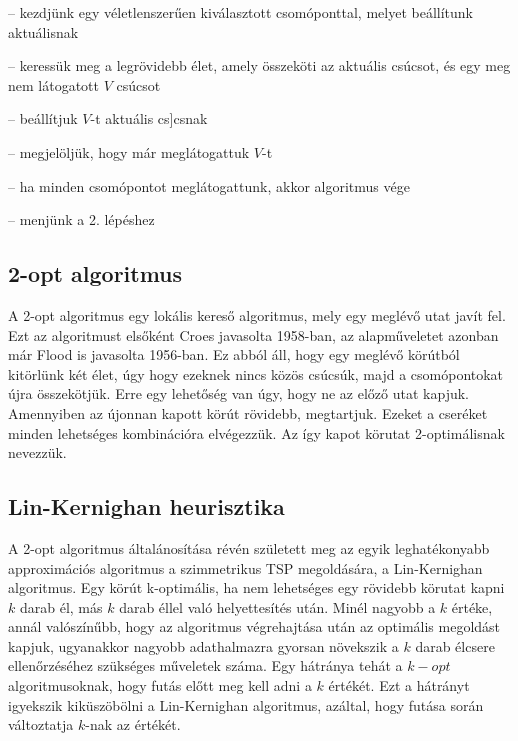 \begin{description}
	\setlength{\itemsep}{0.04mm}
	\item[1. lépés] -- kezdjünk egy véletlenszerűen kiválasztott csomóponttal, melyet beállítunk aktuálisnak
	\item[2. lépés] -- keressük meg a legrövidebb élet, amely összeköti az aktuális csúcsot, és egy meg nem látogatott \(V\) csúcsot
	\item[3. lépés] -- beállítjuk \(V\)-t aktuális cs]csnak
	\item[4. lépés] -- megjelöljük, hogy már meglátogattuk \(V\)-t
	\item[5. lépés] -- ha minden csomópontot meglátogattunk, akkor algoritmus vége
	\item[6. lépés] -- menjünk a 2. lépéshez
\end{description}

\subsection{2-opt algoritmus}

A 2-opt algoritmus egy lokális kereső algoritmus, mely egy meglévő utat javít fel. Ezt az algoritmust elsőként Croes javasolta 1958-ban, az alapműveletet azonban már Flood is javasolta 1956-ban. Ez abból áll, hogy egy meglévő körútból kitörlünk két élet, úgy hogy ezeknek nincs közös csúcsúk, majd a csomópontokat újra összekötjük. Erre egy lehetőség van úgy, hogy ne az előző utat kapjuk. Amennyiben az újonnan kapott körút rövidebb, megtartjuk. Ezeket a cseréket minden lehetséges kombinációra elvégezzük. Az így kapot körutat 2-optimálisnak nevezzük.

\subsection{Lin-Kernighan heurisztika}

A 2-opt algoritmus általánosítása révén született meg az egyik leghatékonyabb approximációs algoritmus a szimmetrikus TSP megoldására, a Lin-Kernighan algoritmus. Egy körút k-optimális, ha nem lehetséges egy rövidebb körutat kapni \(k\) darab él, más \(k\) darab éllel való helyettesítés után. Minél nagyobb a \(k\) értéke, annál valószínűbb, hogy az algoritmus végrehajtása után az optimális megoldást kapjuk, ugyanakkor nagyobb adathalmazra gyorsan növekszik a \(k\) darab élcsere ellenőrzéséhez szükséges műveletek száma. Egy hátránya tehát a \(k-opt\) algoritmusoknak, hogy futás előtt meg kell adni a \(k\) értékét. Ezt a hátrányt igyekszik kiküszöbölni a Lin-Kernighan algoritmus, azáltal, hogy futása során változtatja \(k\)-nak az értékét.


